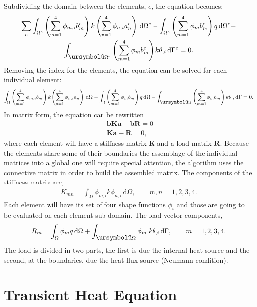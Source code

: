 \documentclass[10pt, a4paper]{article}
\def\urpartial{\mbox{\ursymbol\char"B6}}
\begin{document}
Subdividing the domain between the elements, $e$, the equation becomes:
\begin{multline*}
\sum_e 
 \int_{\Omega^e} \left( \sum_{m=1}^4 \phi_{m,i} b_m^e \right) k \left( \sum_{n=1}^4 \phi_{n,i} a_n^e \right)\, \mathrm{d}\Omega^e -
\int_{\Omega^e} \left( \sum_{m=1}^4 \phi_{m} b_m^e \right) q \, \mathrm{d}\Omega^e - \\
\int_{\urpartial \Omega^e} \left( \sum_{m=1}^4 \phi_{m} b_m^e \right) k \theta_{,i} \, \mathrm{d}\Gamma^e =0 .
\end{multline*}
Removing the index for the elements, the equation can be solved for each individual element:
\begin{multline*}
 \int_{\Omega} \left( \sum_{m=1}^4 \phi_{m,i} b_m \right) k \left( \sum_{n=1}^4 \phi_{n,i} a_n \right)\, \mathrm{d}\Omega - 
\int_{\Omega} \left( \sum_{m=1}^4 \phi_{m} b_m \right) q \, \mathrm{d}\Omega -
\int_{\urpartial \Omega} \left( \sum_{m=1}^4 \phi_{m} b_m \right) k \theta_{,i} \, \mathrm{d}\Gamma =0 .
\end{multline*}
In matrix form, the equation can be rewritten
\begin{align*}
&\boldsymbol{b} \mathbf{K} \boldsymbol{a} -\boldsymbol{b} \mathbf{R} = 0 ;\\
&\mathbf{K} \boldsymbol{a}- \mathbf{R} = 0,
\end{align*}
where each element will have a stiffness matrix $\mathbf{K}$ and a load matrix $\mathbf{R}$. Because the elements share some of their boundaries the assemblage of the individual matrices into a global one will require special attention, the algorithm uses the connective matrix in order to build the assembled matrix. The components of the stiffness matrix are,
\begin{align*}
K_{mn} =  \int_{\Omega} \phi_{m,i} k \phi_{n,i}  \, \mathrm{d}\Omega , \qquad m,n=1,2,3,4.
\end{align*}
Each element will have its set of four shape functions $\phi_i$ and those are going to be evaluated on each element sub-domain. The load vector components,
\begin{align*}
R_{m} =  \int_{\Omega} \phi_{m}q \, \mathrm{d}\Omega + \int_{\urpartial \Omega} \phi_m \; k \theta_{,i}\, \mathrm{d}\Gamma , \qquad m=1,2,3,4.
\end{align*}
The load is divided in two parts, the first is due the internal heat source and the second, at the boundaries, due the heat flux source (Neumann condition).

\section{Transient Heat Equation}
\end{document}
